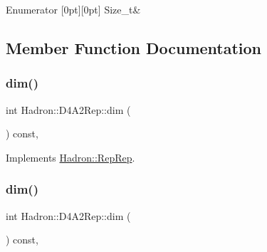 \begin{DoxyEnumFields}{Enumerator}
[0pt][0pt]{}\mbox{\label{structHadron_1_1D4A2Rep_a5fb793c7cbd9dfed445078f94d0f226aa366b0aa803a0f1ed0a3fda4fa8e2ad3d}} 
Size\+\_\+t&\\
\hline

\end{DoxyEnumFields}


\subsection{Member Function Documentation}
\mbox{\label{structHadron_1_1D4A2Rep_adc6df0a40f7af491e096e53145f91543}} 
\subsubsection{\texorpdfstring{dim()}{dim()}\hspace{0.1cm}{\footnotesize\ttfamily [1/3]}}
{\footnotesize\ttfamily int Hadron\+::\+D4\+A2\+Rep\+::dim (\begin{DoxyParamCaption}{ }\end{DoxyParamCaption}) const\hspace{0.3cm}{\ttfamily [inline]}, {\ttfamily [virtual]}}



Implements \mbox{\hyperlink{structHadron_1_1RepRep_a92c8802e5ed7afd7da43ccfd5b7cd92b}{Hadron\+::\+Rep\+Rep}}.

\mbox{\label{structHadron_1_1D4A2Rep_adc6df0a40f7af491e096e53145f91543}} 
\subsubsection{\texorpdfstring{dim()}{dim()}\hspace{0.1cm}{\footnotesize\ttfamily [2/3]}}
{\footnotesize\ttfamily int Hadron\+::\+D4\+A2\+Rep\+::dim (\begin{DoxyParamCaption}{ }\end{DoxyParamCaption}) const\hspace{0.3cm}{\ttfamily [inline]}, {\ttfamily [virtual]}}



